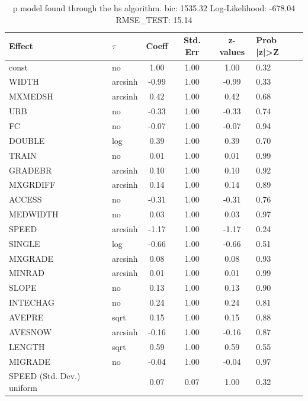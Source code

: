 \begin{table}
	\caption{p model found through the hs algorithm. bic: 1535.32 Log-Likelihood: -678.04 RMSE_TEST: 15.14}
	\begin{center}
		\begin{tabular}{|l|l|c|c|c|l|}
			\hline
			Effect & $\tau$ & Coeff & Std. Err & z-values & Prob |z|>Z \\
			\hline
			const & no & 1.00 & 1.00 & 1.00 & 0.32 \\
			\hline
			WIDTH & arcsinh & -0.99 & 1.00 & -0.99 & 0.33 \\
			\hline
			MXMEDSH & arcsinh & 0.42 & 1.00 & 0.42 & 0.68 \\
			\hline
			URB & no & -0.33 & 1.00 & -0.33 & 0.74 \\
			\hline
			FC & no & -0.07 & 1.00 & -0.07 & 0.94 \\
			\hline
			DOUBLE & log & 0.39 & 1.00 & 0.39 & 0.70 \\
			\hline
			TRAIN & no & 0.01 & 1.00 & 0.01 & 0.99 \\
			\hline
			GRADEBR & arcsinh & 0.10 & 1.00 & 0.10 & 0.92 \\
			\hline
			MXGRDIFF & arcsinh & 0.14 & 1.00 & 0.14 & 0.89 \\
			\hline
			ACCESS & no & -0.31 & 1.00 & -0.31 & 0.76 \\
			\hline
			MEDWIDTH & no & 0.03 & 1.00 & 0.03 & 0.97 \\
			\hline
			SPEED & arcsinh & -1.17 & 1.00 & -1.17 & 0.24 \\
			\hline
			SINGLE & log & -0.66 & 1.00 & -0.66 & 0.51 \\
			\hline
			MXGRADE & arcsinh & 0.08 & 1.00 & 0.08 & 0.93 \\
			\hline
			MINRAD & arcsinh & 0.01 & 1.00 & 0.01 & 0.99 \\
			\hline
			SLOPE & no & 0.13 & 1.00 & 0.13 & 0.90 \\
			\hline
			INTECHAG & no & 0.24 & 1.00 & 0.24 & 0.81 \\
			\hline
			AVEPRE & sqrt & 0.15 & 1.00 & 0.15 & 0.88 \\
			\hline
			AVESNOW & arcsinh & -0.16 & 1.00 & -0.16 & 0.87 \\
			\hline
			LENGTH & sqrt & 0.59 & 1.00 & 0.59 & 0.55 \\
			\hline
			MIGRADE & no & -0.04 & 1.00 & -0.04 & 0.97 \\
			\hline
			SPEED (Std. Dev.) uniform &  & 0.07 & 0.07 & 1.00 & 0.32 \\
			\hline

\end{tabular}
\end{center}
\end{table}
